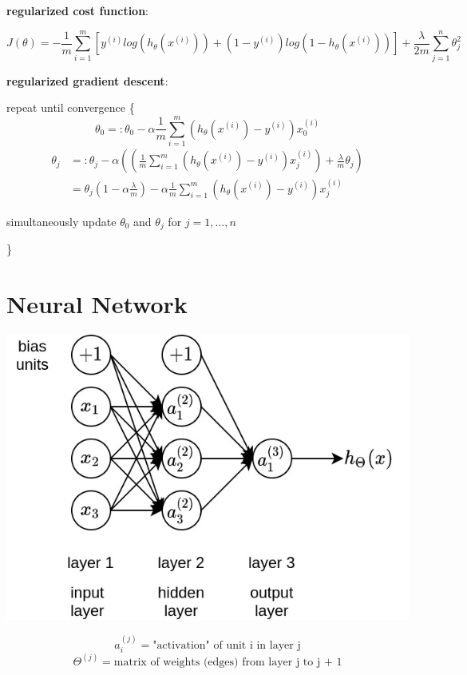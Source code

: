 \documentclass{article}
\begin{document}
\noindent \textbf{regularized cost function}:

\[J(\theta) = - \frac{1}{m} \sum_{i = 1}^{m} [y^{(i)} log(h_{\theta} (x^{(i)})) + (1 - y^{(i)}) log(1 - h_{\theta} (x^{(i)}))] + \frac{\lambda}{2m} \sum_{j = 1}^n \theta_j^2\]

\noindent \textbf{regularized gradient descent}:

\noindent repeat until convergence \{
\[\theta_0 =: \theta_0 - \alpha \frac{1}{m} \sum_{i = 1}^m (h_{\theta}(x^{(i)}) - y^{(i)}) x^{(i)}_0\]
\begin{equation*}
\begin{split}
\theta_j & =: \theta_j - \alpha ((\frac{1}{m} \sum_{i = 1}^m (h_{\theta}(x^{(i)}) - y^{(i)}) x^{(i)}_j) + \frac{\lambda}{m} \theta_j) \\
 & = \theta_j (1 - \alpha \frac{\lambda}{m}) - \alpha \frac{1}{m} \sum_{i = 1}^m (h_{\theta}(x^{(i)}) - y^{(i)}) x^{(i)}_j
\end{split}
\end{equation*}

\centerline{simultaneously update \(\theta_0\) and \(\theta_j\) for \(j = 1, \dots, n\)}
\}

\section{Neural Network}

\begin{center}
\includegraphics[scale=0.4]{./images/neural_network.jpg}
\end{center}

\[a_i^{(j)} = \text{"activation" of unit i in layer j}\]
\[\Theta^{(j)} = \text{matrix of weights (edges) from layer j to j + 1}\]
\end{document}
